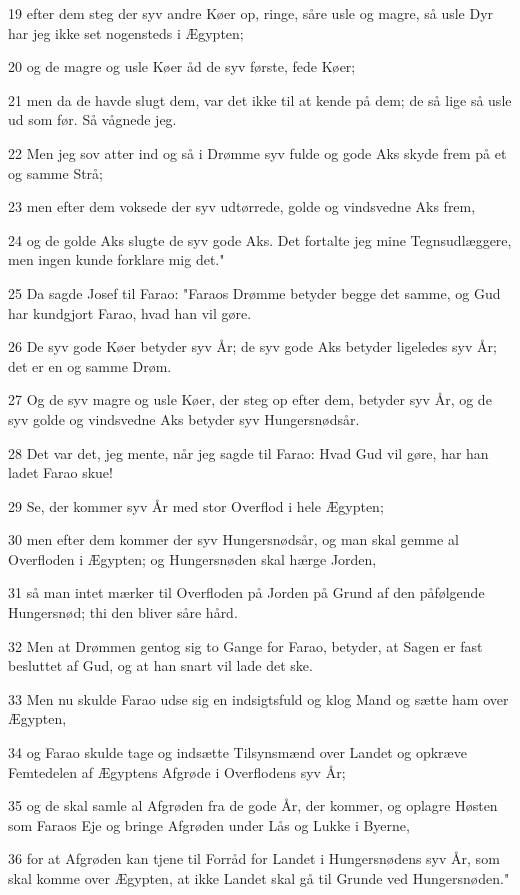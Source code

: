 \par 19 efter dem steg der syv andre Køer op, ringe, såre usle og magre, så usle Dyr har jeg ikke set nogensteds i Ægypten;
\par 20 og de magre og usle Køer åd de syv første, fede Køer;
\par 21 men da de havde slugt dem, var det ikke til at kende på dem; de så lige så usle ud som før. Så vågnede jeg.
\par 22 Men jeg sov atter ind og så i Drømme syv fulde og gode Aks skyde frem på et og samme Strå;
\par 23 men efter dem voksede der syv udtørrede, golde og vindsvedne Aks frem,
\par 24 og de golde Aks slugte de syv gode Aks. Det fortalte jeg mine Tegnsudlæggere, men ingen kunde forklare mig det."
\par 25 Da sagde Josef til Farao: "Faraos Drømme betyder begge det samme, og Gud har kundgjort Farao, hvad han vil gøre.
\par 26 De syv gode Køer betyder syv År; de syv gode Aks betyder ligeledes syv År; det er en og samme Drøm.
\par 27 Og de syv magre og usle Køer, der steg op efter dem, betyder syv År, og de syv golde og vindsvedne Aks betyder syv Hungersnødsår.
\par 28 Det var det, jeg mente, når jeg sagde til Farao: Hvad Gud vil gøre, har han ladet Farao skue!
\par 29 Se, der kommer syv År med stor Overflod i hele Ægypten;
\par 30 men efter dem kommer der syv Hungersnødsår, og man skal gemme al Overfloden i Ægypten; og Hungersnøden skal hærge Jorden,
\par 31 så man intet mærker til Overfloden på Jorden på Grund af den påfølgende Hungersnød; thi den bliver såre hård.
\par 32 Men at Drømmen gentog sig to Gange for Farao, betyder, at Sagen er fast besluttet af Gud, og at han snart vil lade det ske.
\par 33 Men nu skulde Farao udse sig en indsigtsfuld og klog Mand og sætte ham over Ægypten,
\par 34 og Farao skulde tage og indsætte Tilsynsmænd over Landet og opkræve Femtedelen af Ægyptens Afgrøde i Overflodens syv År;
\par 35 og de skal samle al Afgrøden fra de gode År, der kommer, og oplagre Høsten som Faraos Eje og bringe Afgrøden under Lås og Lukke i Byerne,
\par 36 for at Afgrøden kan tjene til Forråd for Landet i Hungersnødens syv År, som skal komme over Ægypten, at ikke Landet skal gå til Grunde ved Hungersnøden."
